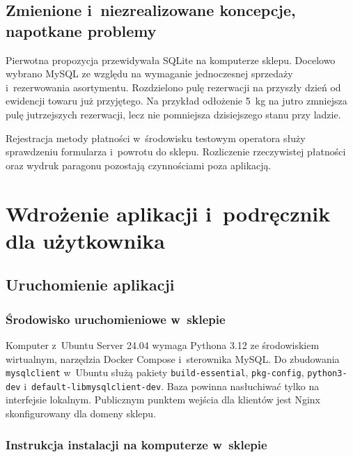 \documentclass[12pt,a4paper,oneside]{article}
\newcounter{pu}
\begin{document}
\subsection{Zmienione i~niezrealizowane koncepcje, napotkane problemy}

Pierwotna propozycja przewidywała SQLite na komputerze sklepu. Docelowo wybrano MySQL ze względu na wymaganie jednoczesnej sprzedaży i~rezerwowania asortymentu. Rozdzielono pulę rezerwacji na przyszły dzień od ewidencji towaru już przyjętego. Na przykład odłożenie 5~kg na jutro zmniejsza pulę jutrzejszych rezerwacji, lecz nie pomniejsza dzisiejszego stanu przy ladzie.

Rejestracja metody płatności w~środowisku testowym operatora służy sprawdzeniu formularza i~powrotu do sklepu. Rozliczenie rzeczywistej płatności oraz wydruk paragonu pozostają czynnościami poza aplikacją.



\clearpage
\section{Wdrożenie aplikacji i~podręcznik dla użytkownika}
\label{ch:wdrozenie}

\subsection{Uruchomienie aplikacji}

\subsubsection{Środowisko uruchomieniowe w~sklepie}

Komputer z~Ubuntu Server 24.04 wymaga Pythona 3.12 ze środowiskiem wirtualnym, narzędzia Docker Compose i~sterownika MySQL. Do zbudowania \texttt{mysqlclient} w~Ubuntu służą pakiety \texttt{build-essential}, \texttt{pkg-config}, \texttt{python3-dev} i~\texttt{default-\allowbreak{}libmysqlclient-\allowbreak{}dev}. Baza powinna nasłuchiwać tylko na interfejsie lokalnym. Publicznym punktem wejścia dla klientów jest Nginx skonfigurowany dla domeny sklepu.


\subsubsection{Instrukcja instalacji na komputerze w~sklepie}
\label{sec:instalacja}
\end{document}
